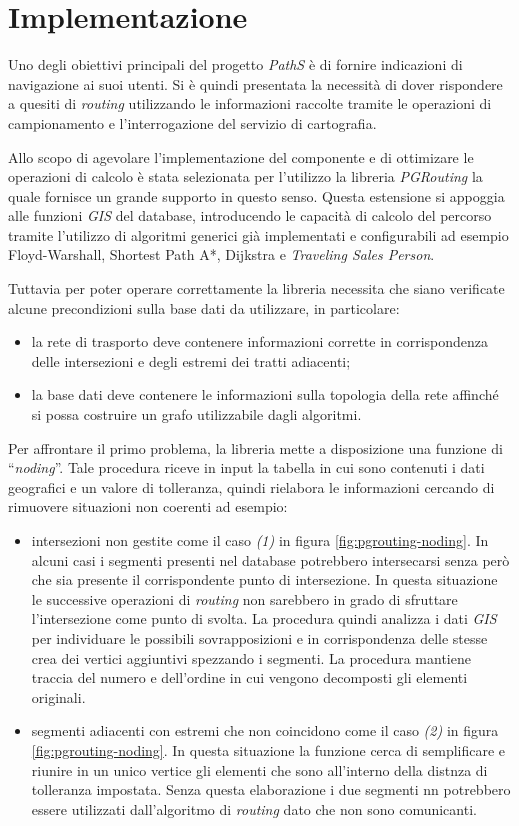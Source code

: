 \section{Implementazione}
Uno degli obiettivi principali del progetto \emph{PathS} è di fornire indicazioni di navigazione ai suoi utenti. Si è quindi presentata la necessità di dover rispondere a quesiti di \emph{routing} utilizzando le informazioni raccolte tramite le operazioni di campionamento e l'interrogazione del servizio di cartografia. 

Allo scopo di agevolare l'implementazione del componente e di ottimizare le operazioni di calcolo è stata selezionata per l'utilizzo la libreria \emph{PGRouting} la quale fornisce un grande supporto in questo senso. Questa estensione si appoggia alle funzioni \emph{GIS} del database, introducendo le capacità di calcolo del percorso tramite l'utilizzo di algoritmi generici già implementati e configurabili ad esempio Floyd-Warshall, Shortest Path A*, Dijkstra e \emph{Traveling Sales Person}.

Tuttavia per poter operare correttamente la libreria necessita che siano verificate alcune precondizioni sulla base dati da utilizzare, in particolare:
\begin{itemize}
	\item la rete di trasporto deve contenere informazioni corrette in corrispondenza delle intersezioni e degli estremi dei tratti adiacenti;
	\item la base dati deve contenere le informazioni sulla topologia della rete affinché si possa costruire un grafo utilizzabile dagli algoritmi.
\end{itemize}

Per affrontare il primo problema, la libreria mette a disposizione una funzione di ``\emph{noding}''. Tale procedura riceve in input la tabella in cui sono contenuti i dati geografici e un valore di tolleranza, quindi rielabora le informazioni cercando di rimuovere situazioni non coerenti ad esempio:
\begin{itemize}
 \item intersezioni non gestite come il caso \emph{(1)} in figura \ref{fig:pgrouting-noding}. In alcuni casi i segmenti presenti nel database potrebbero intersecarsi senza però che sia presente il corrispondente punto di intersezione. In questa situazione le successive operazioni di \emph{routing} non sarebbero in grado di sfruttare l'intersezione come punto di svolta. La procedura quindi analizza i dati \emph{GIS} per individuare le possibili sovrapposizioni e in corrispondenza delle stesse crea dei vertici aggiuntivi spezzando i segmenti. La procedura mantiene traccia del numero e dell'ordine in cui vengono decomposti gli elementi originali.
 \item segmenti adiacenti con estremi che non coincidono come il caso \emph{(2)} in figura \ref{fig:pgrouting-noding}. In questa situazione la funzione cerca di semplificare e riunire in un unico vertice gli elementi che sono all'interno della distnza di tolleranza impostata. Senza questa elaborazione i due segmenti nn potrebbero essere utilizzati dall'algoritmo di \emph{routing} dato che non sono comunicanti.
\end{itemize}

